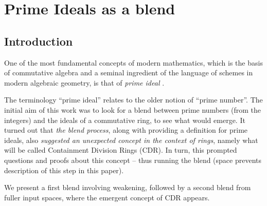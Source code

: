 \section{Prime Ideals as a blend}
\label{sec:prime_ideals}

\subsection*{Introduction}
One of the most fundamental concepts of modern mathematics, which is
the basis of commutative algebra and a seminal ingredient of the
language of schemes in modern algebraic geometry, is that of
\emph{prime ideal} \parencite{EGAI,eisenbud}.

The terminology ``prime ideal'' relates to the older notion of ``prime
number''. The initial aim of this work was to look for a blend between
prime numbers (from the integers) and the ideals of a commutative
ring, to see what would emerge. It turned out that \emph{the blend process},
along with providing a definition for prime ideals, also \emph{suggested 
an unexpected concept in the context of rings}, 
namely what will be called Containment Division Rings (CDR). 
In turn, this prompted questions and
proofs about this concept -- thus running the blend (space prevents
description of this step in this paper).

We present a first blend involving weakening, followed by a second
blend from fuller input spaces, where the emergent concept of CDR
appears.



